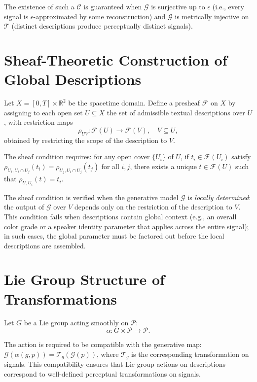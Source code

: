 \documentclass[12pt,a4paper]{article}
\theoremstyle{definition}
\theoremstyle{remark}
\begin{document}
The existence of such a $\mathcal{C}$ is guaranteed when $\mathcal{G}$ is surjective up to $\epsilon$ (i.e., every signal is $\epsilon$-approximated by some reconstruction) and $\mathcal{G}$ is metrically injective on $\mathcal{T}$ (distinct descriptions produce perceptually distinct signals).

\section{Sheaf-Theoretic Construction of Global Descriptions}
\label{app:sheaves}

Let $X = [0,T] \times \mathbb{R}^2$ be the spacetime domain. Define a presheaf $\mathcal{F}$ on $X$ by assigning to each open set $U \subseteq X$ the set of admissible textual descriptions over $U$, with restriction maps
\[
\rho_{UV} : \mathcal{F}(U) \to \mathcal{F}(V), \quad V \subseteq U,
\]
obtained by restricting the scope of the description to $V$.

The sheaf condition requires: for any open cover $\{U_i\}$ of $U$, if $t_i \in \mathcal{F}(U_i)$ satisfy $\rho_{U_i, U_i \cap U_j}(t_i) = \rho_{U_j, U_i \cap U_j}(t_j)$ for all $i,j$, there exists a unique $t \in \mathcal{F}(U)$ such that $\rho_{U,U_i}(t) = t_i$.

The sheaf condition is verified when the generative model $\mathcal{G}$ is \emph{locally determined}: the output of $\mathcal{G}$ over $V$ depends only on the restriction of the description to $V$. This condition fails when descriptions contain global context (e.g., an overall color grade or a speaker identity parameter that applies across the entire signal); in such cases, the global parameter must be factored out before the local descriptions are assembled.

\section{Lie Group Structure of Transformations}
\label{app:lie}

Let $G$ be a Lie group acting smoothly on $\mathcal{P}$:
\[
\alpha : G \times \mathcal{P} \to \mathcal{P}.
\]

The action is required to be compatible with the generative map: $\mathcal{G}(\alpha(g,p)) = \mathcal{T}_g(\mathcal{G}(p))$, where $\mathcal{T}_g$ is the corresponding transformation on signals. This compatibility ensures that Lie group actions on descriptions correspond to well-defined perceptual transformations on signals.
\end{document}
